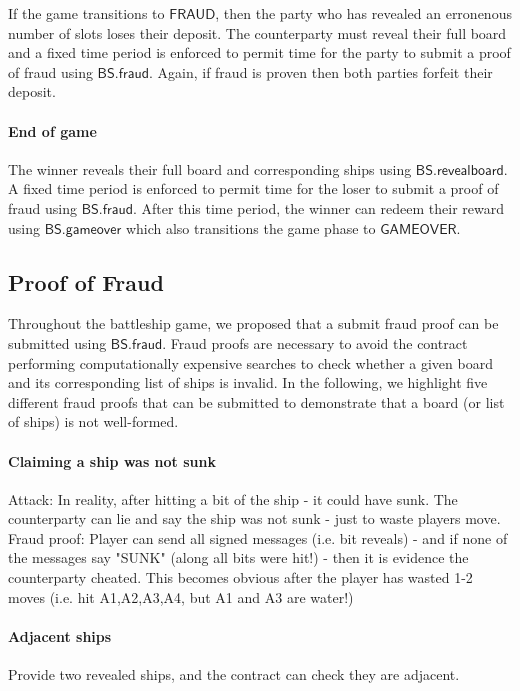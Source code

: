 \documentclass{llncs}
\newcommand{\gamefraud}{\mathsf{FRAUD}}
\newcommand{\gamefinished}{\mathsf{GAMEOVER}}
\newcommand{\battleshipfraud}{\mathsf{BS.fraud}}
\newcommand{\battleshiprevealboard}{\mathsf{BS.revealboard}}
\newcommand{\battleshipgameover}{\mathsf{BS.gameover}}
\begin{document}
If the game transitions to $\gamefraud$, then the party who has revealed an erronenous number of slots loses their deposit.
The counterparty must reveal their full board and a fixed time period is enforced to permit time for the party to submit a proof of fraud using $\battleshipfraud$. 
Again, if fraud is proven then both parties forfeit their deposit. 

\paragraph{End of game} 

The winner reveals their full board and corresponding ships using $\battleshiprevealboard$.
A fixed time period is enforced to permit time for the loser to submit a proof of fraud using $\battleshipfraud$.
After this time period, the winner can redeem their reward using $\battleshipgameover$ which also transitions the game phase to $\gamefinished$. 


\subsection{Proof of Fraud}

Throughout the battleship game, we proposed that a submit fraud proof can be submitted using $\battleshipfraud$.
Fraud proofs are necessary to avoid the contract performing computationally expensive searches to check whether a given board and its corresponding list of ships is invalid. 
In the following, we highlight five different fraud proofs that can be submitted to demonstrate that a board (or list of ships) is not well-formed. 

\paragraph{Claiming a ship was not sunk}

Attack: In reality, after hitting a bit of the ship - it could have sunk. The counterparty can lie and say the ship was not sunk - just to waste players move. 
Fraud proof: Player can send all signed messages (i.e. bit reveals) - and if none of the messages say "SUNK" (along all bits were hit!) - then it is evidence the counterparty cheated. This becomes obvious after the player has wasted 1-2 moves (i.e. hit A1,A2,A3,A4, but A1 and A3 are water!) 

\paragraph{Adjacent ships} 
Provide two revealed ships, and the contract can check they are adjacent. 
\end{document}
